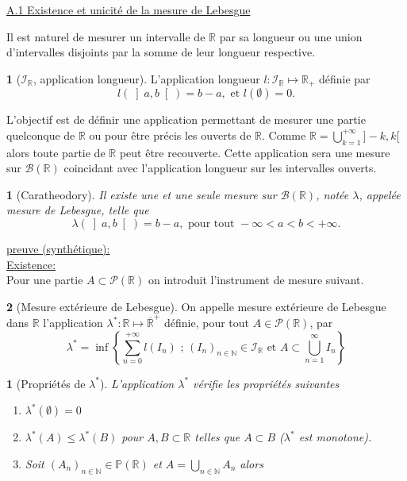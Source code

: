 \documentclass[8pt,notheorems]{beamer}
\def \N{\mathbb N}
\newtheorem{theorem}{\translate{Theorem}}[section]
\newtheorem{theorem}{\translate{Theoreme}}
\newtheorem{prop}{\translate{Proposition}}
\theoremstyle{definition}
\newtheorem{definition}{\translate{Definition}}
\theoremstyle{example}
\theoremstyle{mystyle}
\theoremstyle{plain}
\begin{document}
\appendix
\begin{frame}[allowframebreaks]
\underline{A.1 Existence et unicité de la mesure de Lebesgue}

Il est naturel de mesurer un intervalle de $\mathbb{R}$ par sa longueur ou une union d'intervalles disjoints par la somme de leur longueur respective.
\begin{definition}[$\mathcal{I}_{\mathbb{R}}$, application longueur]
L'application longueur $l:\mathcal{I}_{\mathbb{R}}\mapsto\mathbb{R}_{+}$ définie par
$$
l(\left]a,b\right[)=b-a,\text{ et }l(\emptyset)=0.
$$
\end{definition}
L'objectif est de définir une application permettant de mesurer une partie quelconque de $\mathbb{R}$ ou pour être précis les ouverts de $\mathbb{R}$. Comme $\mathbb{R}=\bigcup_{k=1}^{+\infty}]-k,k[$ alors toute partie de $\mathbb{R}$ peut être recouverte. Cette application sera une mesure sur $\mathcal{B}(\mathbb{R})$ coincidant avec l'application longueur sur les intervalles ouverts.
\begin{theorem}[Caratheodory]\label{theo:Caratheodory}
Il existe une et une seule mesure sur $\mathcal{B}(\mathbb{R})$, notée $\lambda$, appelée mesure de Lebesgue, telle que
$$
\lambda\left(\left]a,b\right[\right)=b-a,\text{ pour tout }-\infty<a<b<+\infty.
$$
\end{theorem}
\underline{preuve (synthétique):}\\
\underline{Existence:}\\
Pour une partie $A\subset\mathcal{P}(\mathbb{R})$ on introduit l'instrument de mesure suivant.
\begin{definition}[Mesure extérieure de Lebesgue]
On appelle mesure extérieure de Lebesgue dans $\mathbb{R}$ l'application $\lambda^{\ast}:\mathcal{\mathbb{R}}\mapsto\overline{\mathbb{R}}^{+}$ définie, pour tout $A\in\mathcal{P}(\mathbb{R})$, par
$$
\lambda^{\ast}=\inf\left\{
\sum_{n=0}^{+\infty}l(I_n)\text{ ; }(I_{n})_{n\in\N}\in\mathcal{I}_{\mathbb{R}}
\text{ et }A\subset\bigcup_{n=1}^{\infty}I_n
\right\}
$$
 \end{definition}
\begin{prop}[Propriétés de $\lambda^{\ast}$]
L'application $\lambda^{\ast}$ vérifie les propriétés suivantes
\begin{enumerate}
\item $\lambda^{\ast}(\emptyset)=0$
\item $\lambda^{\ast}(A)\leq \lambda^{\ast}(B)$ pour $A,B\subset\mathbb{R}$ telles que $A\subset B$ ($\lambda^{\ast}$ est monotone).
\item Soit $(A_n)_{n\in\mathbb{N}}\in\mathbb{P}(\mathbb{R})$ et $A=\bigcup_{n\in\mathbb{N}}A_n$ alors

\end{enumerate}
\end{prop}
\end{frame}
\end{document}
